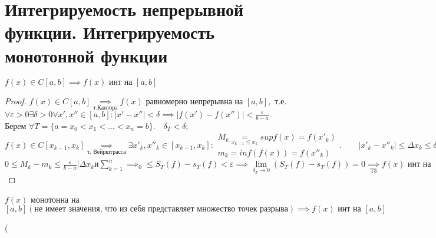 \documentclass[../main.tex]{subfiles}
\begin{document}
\newpage
{}
\section{Интегрируемость непрерывной функции. Интегрируемость монотонной функции}
\begin{theorem}
    $f(x)\in C[a,b]\implies f(x) \text{ инт на } [a,b]$
\end{theorem}

\begin{proof}
    $f(x)\in C[a,b]\underset{\text{т.Кантора}}{\implies} f(x)$ равномерно непрерывна на $[a,b],$ т.е. $\forall \varepsilon>0 \exists \delta>0 \forall x',x''\in[a,b]: |x'-x''|<\delta \implies |f(x')-f(x'')|<\frac{\varepsilon}{b-a}.$\\ 
    Берем $\forall T=\{a=x_{0}<x_{1}<\dots<x_{n}=b\}.\quad \delta_{T}<\delta;$\\ 
    $f(x)\in C[x_{k-1},x_{k}]\underset{\text{т. Вейрштрасса}}{\implies} \exists x'_{k},x''_{k}\in[x_{k-1},x_{k}]: \begin {aligned} M_{k}\underset{x_{k-1}\leqslant x_{k}}{=}supf(x)=f(x'_{k}) \\ 
    m_{k}=inf(f(x))=f(x''_{k})\end{aligned}.\qquad |x'_{k}-x''_{k}|\leqslant \Delta x_{k}\leqslant \delta_{t}\implies |M_{k}-m_{k}| < \frac{\varepsilon}{b-a}.$\\ 
    $0\leqslant M_{k}-m_{k}\leqslant \frac{\varepsilon}{b-a} | \Delta x_{k} \text{и} \sum_{k=1}^{n}\implies_{0}\leqslant S_{T}(f)-s_{T}(f)<\varepsilon\implies \lim\limits_{\delta_{T}\to 0}(S_{T}(f)-s_{T}(f))=0 \underset{\text{Т3}}{\implies}f(x) \text{ инт на } [a,b] $
    
\end{proof} 

\begin{theorem}
    $f(x)$ монотонна на $[a,b](\text{не имеет значения, что из себя представляет множество точек разрыва})\implies f(x) \text{ инт на } [a,b]$
    
\end{theorem}(
\end{document}
